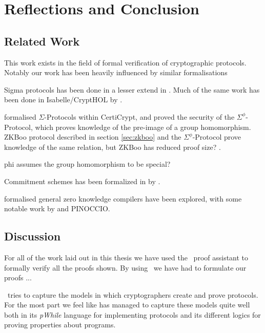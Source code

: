 \chapter{Reflections and Conclusion}
\label{sec:reflection_conclusion}

\section{Related Work}
\label{sec:related_work}

This work exists in the field of formal verification of cryptographic protocols.
Notably our work has been heavily influenced by similar formalisations
\cite{cryptoeprint:2019:1185,DBLP:journals/corr/MetereD17,certicrypt_sigma,zkcrypt,Yao}

Sigma protocols has been done in a lesser extend in \easycrypt. Much of the same
work has been done in Isabelle/CryptHOL by \citeauthor{cryptoeprint:2019:1185}.

\citeauthor{certicrypt_sigma} formalised $\Sigma$-Protocols within CertiCrypt,
and proved the security of the $\Sigma^{\phi}$-Protocol, which proves knowledge
of the pre-image of a group homomorphism. ZKBoo protocol described in section
\ref{sec:zkboo} and the $\Sigma^{\phi}$-Protocol prove knowledge of the same
relation, but ZKBoo has reduced proof size? .

phi assumes the group homomorphism to be special?


Commitment schemes has been formalized in \easycrypt by
\citeauthor{DBLP:journals/corr/MetereD17}.


formalised general zero knowledge compilers have been explored, with some
notable work by \citeauthor{zkcrypt} and PINOCCIO.



\section{Discussion}
\label{sec:discussion}
For all of the work laid out in this thesis we have used the \easycrypt\ proof
assistant to formally verify all the proofs shown. By using \easycrypt\ we have
had to formulate our proofs ...

\easycrypt\ tries to capture the models in which cryptographers create and prove
protocols. For the most part we feel like \easycrypt has managed to capture
these models quite well both in its \textit{pWhile} language for implementing
protocols and its different logics for proving properties about programs.


